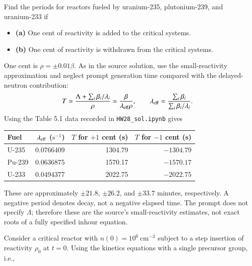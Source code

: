 

Find the periods for reactors fueled by uranium-235, plutonium-239, and
uranium-233 if

\begin{itemize}
\setlength{\itemsep}{0pt}\setlength{\parskip}{0pt}
\item
  \textbf{(a)} One cent of reactivity is added to the critical systems.
\item
  \textbf{(b)} One cent of reactivity is withdrawn from the critical
  systems.
\end{itemize}

\begin{adaptedsolution}
One cent is $\rho=\pm0.01\beta$. As in the source solution, use the
small-reactivity approximation and neglect prompt generation time compared
with the delayed-neutron contribution:
\[
T\simeq\frac{\Lambda+\sum_i\beta_i/\lambda_i}{\rho}
\simeq\frac{\beta}{\lambda_{\rm eff}\rho},\qquad
\lambda_{\rm eff}=\frac{\sum_i\beta_i}{\sum_i\beta_i/\lambda_i}.
\]
Using the Table 5.1 data recorded in \texttt{HW28\_sol.ipynb} gives
\begin{center}
\begin{tabular}{lrrr}
\toprule
Fuel & $\lambda_{\rm eff}$ ($\mathrm{s^{-1}}$) & $T$ for $+1$ cent (s)& $T$ for $-1$ cent (s)\\
\midrule
U-235 & 0.0766409 & 1304.79 & $-1304.79$\\
Pu-239 & 0.0636875 & 1570.17 & $-1570.17$\\
U-233 & 0.0494377 & 2022.75 & $-2022.75$\\
\bottomrule
\end{tabular}
\end{center}
These are approximately $\pm21.8$, $\pm26.2$, and $\pm33.7$ minutes,
respectively. A negative period denotes decay, not a negative elapsed time.
The prompt does not specify $\Lambda$; therefore these are the source's
small-reactivity estimates, not exact roots of a fully specified inhour equation.
\end{adaptedsolution}

\newpage


Consider a critical reactor with \(n(0)=10^6~\mathrm{cm^{-3}}\) subject
to a step insertion of reactivity \(\rho_0\) at \(t=0\). Using the
kinetics equations with a single precursor group, i.e.,

